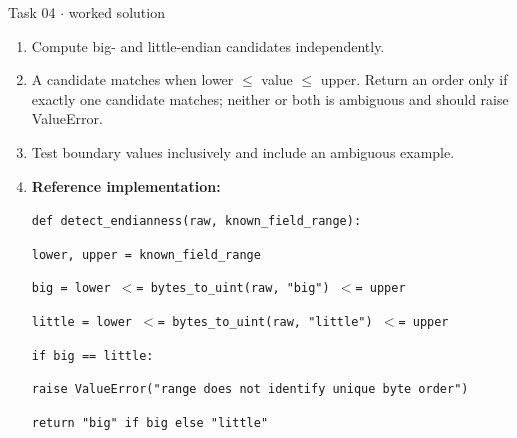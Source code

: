 \documentclass[11pt]{article}
\begin{document}
\begin{keepsection}
\begin{workedbox}{Task 04 \ensuremath{\cdot} worked solution}
\begin{enumerate}
\item Compute big- and little-endian candidates independently.
\item A candidate matches when lower \ensuremath{\leq} value \ensuremath{\leq} upper. Return an order only if exactly one candidate matches; neither or both is ambiguous and should raise ValueError.
\item Test boundary values inclusively and include an ambiguous example.
\item {}
\textbf{Reference implementation:}
\begin{tcolorbox}[colback=Paperblue,colframe=Paperblue,boxrule=0pt,arc=0pt,left=7pt,right=7pt,top=5pt,bottom=5pt]\small\sloppy
\noindent\hspace*{0em}\texttt{def detect\_endianness(raw, known\_field\_range):}\par
\noindent\hspace*{1em}\texttt{lower, upper = known\_field\_range}\par
\noindent\hspace*{1em}\texttt{big = lower \ensuremath{<}= bytes\_to\_uint(raw, "big") \ensuremath{<}= upper}\par
\noindent\hspace*{1em}\texttt{little = lower \ensuremath{<}= bytes\_to\_uint(raw, "little") \ensuremath{<}= upper}\par
\noindent\hspace*{1em}\texttt{if big == little:}\par
\noindent\hspace*{3em}\texttt{raise ValueError("range does not identify unique byte order")}\par
\noindent\hspace*{1em}\texttt{return "big" if big else "little"}\par
\end{tcolorbox}
\end{enumerate}
\end{workedbox}

\end{keepsection}
\end{document}
